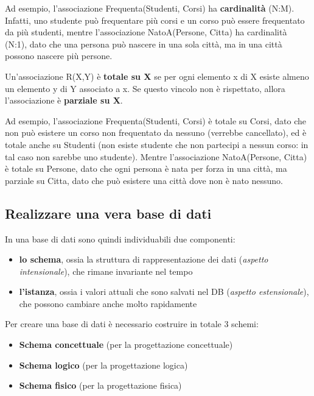 \documentclass[11pt, a4paper, titlepage, oneside]{scrbook}
\begin{document}
Ad esempio, l'associazione Frequenta(Studenti, Corsi) ha \textbf{cardinalità} (N:M). Infatti, uno studente può frequentare più corsi e un corso può essere frequentato da più studenti, mentre l'associazione NatoA(Persone, Citta) ha cardinalità (N:1), dato che una persona può nascere in una sola città, ma in una città possono nascere più persone.

\begin{Proprieta}
\label{prop-vincolo-totalita}
Un'associazione R(X,Y) è \textbf{totale su X} se per ogni elemento x di X esiste almeno un elemento y di Y associato a x. Se questo vincolo non è rispettato, allora l'associazione è \textbf{parziale su X}.
\end{Proprieta}

Ad esempio, l'associazione Frequenta(Studenti, Corsi) è totale su Corsi, dato che non può esistere un corso non frequentato da nessuno (verrebbe cancellato), ed è totale anche su Studenti (non esiste studente che non partecipi a nessun corso: in tal caso non sarebbe uno studente). Mentre l'associazione NatoA(Persone, Citta) è totale su Persone, dato che ogni persona è nata per forza in una città, ma parziale su Citta, dato che può esistere una città dove non è nato nessuno.

\subsection{Realizzare una vera base di dati}

In una base di dati sono quindi individuabili due componenti:
\begin{itemize}
    \item \textbf{lo schema}, ossia la struttura di rappresentazione dei dati (\textit{aspetto intensionale}), che rimane invariante nel tempo
    \item \textbf{l'istanza}, ossia i valori attuali che sono salvati nel DB (\textit{aspetto estensionale}), che possono cambiare anche molto rapidamente
\end{itemize}

Per creare una base di dati è necessario costruire in totale 3 schemi:
\begin{itemize}
    \item \textbf{Schema concettuale} (per la progettazione concettuale)
    \item \textbf{Schema logico} (per la progettazione logica)
    \item \textbf{Schema fisico} (per la progettazione fisica)
\end{itemize}
\end{document}
